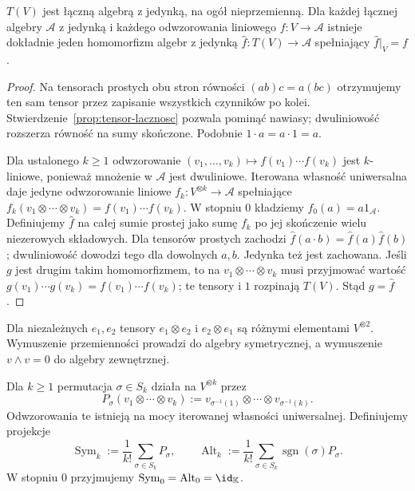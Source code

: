 \begin{twierdzenie}
\label{thm:algebra-tensorowa-universal}
$T(V)$ jest łączną algebrą z jedynką, na ogół nieprzemienną.
Dla każdej łącznej algebry $\mathcal A$ z jedynką i każdego
odwzorowania liniowego $f\colon V\to\mathcal A$ istnieje dokładnie jeden
homomorfizm algebr z jedynką $\widehat f\colon T(V)\to\mathcal A$
spełniający $\widehat f|_V=f$.
\end{twierdzenie}
\begin{proof}
Na tensorach prostych obu stron równości
$(ab)c=a(bc)$ otrzymujemy ten sam tensor przez zapisanie
wszystkich czynników po kolei. Stwierdzenie~\ref{prop:tensor-lacznosc}
pozwala pominąć nawiasy; dwuliniowość rozszerza równość
na sumy skończone. Podobnie $1\cdot a=a\cdot1=a$.

Dla ustalonego $k\geq1$ odwzorowanie
$(v_1,\ldots,v_k)\mapsto f(v_1)\cdots f(v_k)$
jest $k$-liniowe, ponieważ mnożenie w $\mathcal A$ jest
dwuliniowe. Iterowana własność uniwersalna daje jedyne odwzorowanie
liniowe $f_k\colon V^{\otimes k}\to\mathcal A$ spełniające
$f_k(v_1\otimes\cdots\otimes v_k)=f(v_1)\cdots f(v_k)$.
W stopniu $0$ kładziemy $f_0(a)=a1_{\mathcal A}$.
Definiujemy $\widehat f$ na całej sumie prostej jako sumę
$f_k$ po jej skończenie wielu niezerowych składowych.
Dla tensorów prostych zachodzi
$\widehat f(a\cdot b)=\widehat f(a)\widehat f(b)$;
dwuliniowość dowodzi tego dla dowolnych $a,b$.
Jedynka też jest zachowana. Jeśli $g$ jest drugim takim
homomorfizmem, to na $v_1\otimes\cdots\otimes v_k$
musi przyjmować wartość $g(v_1)\cdots g(v_k)
=f(v_1)\cdots f(v_k)$; te tensory i $1$ rozpinają $T(V)$.
Stąd $g=\widehat f$.
\end{proof}

Dla niezależnych $e_1,e_2$ tensory $e_1\otimes e_2$ i
$e_2\otimes e_1$ są różnymi elementami $V^{\otimes2}$.
Wymuszenie przemienności prowadzi do algebry symetrycznej,
a wymuszenie $v\wedge v=0$ do algebry zewnętrznej.

\begin{definicja}
\label{def:sym-alt}
Dla $k\geq1$ permutacja $\sigma\in S_k$ działa na
$V^{\otimes k}$ przez
\[
 P_\sigma(v_1\otimes\cdots\otimes v_k)
 :=v_{\sigma^{-1}(1)}\otimes\cdots\otimes v_{\sigma^{-1}(k)}.
\]
Odwzorowania te istnieją na mocy iterowanej własności uniwersalnej.
Definiujemy projekcje
\begin{equation}\label{eq:sym-alt}
 \operatorname{Sym}_k:=\frac1{k!}\sum_{\sigma\in S_k}P_\sigma,
 \qquad
 \operatorname{Alt}_k:=\frac1{k!}\sum_{\sigma\in S_k}
\operatorname{sgn}(\sigma)P_\sigma.
\end{equation}
W stopniu $0$ przyjmujemy
$\operatorname{Sym}_0=\operatorname{Alt}_0=\id_{\mathbb K}$.
\end{definicja}

